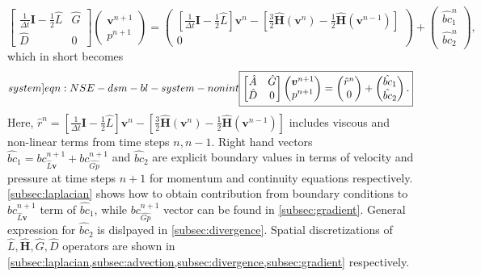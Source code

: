 \documentclass{article}
\numberwithin{equation}{section}
\begin{document}
	\begin{equation}
		\begin{bmatrix}
			\frac{1}{\Delta t}\mathbf{I}-\frac{1}{2}\hat{L} & \hat{G} \\
			\hat{D} & 0
		\end{bmatrix}
		\begin{pmatrix}
			\boldsymbol{v}^{n+1} \\ 
			p^{n+1}
		\end{pmatrix}
		=
		\begin{pmatrix}
			\left[\frac{1}{\Delta t}\mathbf{I}-\frac{1}{2}\hat{L}\right] \boldsymbol{v}^n - \left[\frac{3}{2}\hat{\mathbf{H}}(\boldsymbol{v}^n) - \frac{1}{2}\hat{\mathbf{H}}(\boldsymbol{v}^{n-1})\right]\\
			0
		\end{pmatrix}
		+
		\begin{pmatrix}
			\hat{bc}_1^n\\
			\hat{bc}_2^n
		\end{pmatrix},
	\end{equation}	
which in short becomes
\begin{equation}\label[system]{eqn:NSE-dsm-bl-system-nonint}
	\boxed{\begin{bmatrix}
		\hat{A} & \hat{G} \\
		\hat{D} & 0
	\end{bmatrix}
	\begin{pmatrix}
		\boldsymbol{v}^{n+1} \\ 
		p^{n+1}
	\end{pmatrix}
	=
	\begin{pmatrix}
		\hat{r}^n \\
		0
	\end{pmatrix}
	+
	\begin{pmatrix}
		\hat{bc}_1\\
		\hat{bc}_2
	\end{pmatrix}.}
\end{equation}
Here, $\hat{r}^n=\left[\frac{1}{\Delta t}\mathbf{I}-\frac{1}{2}\hat{L}\right] \boldsymbol{v}^n - \left[\frac{3}{2}\hat{\mathbf{H}}(\boldsymbol{v}^n) - \frac{1}{2}\hat{\mathbf{H}}(\boldsymbol{v}^{n-1})\right]$ includes viscous and non-linear terms from time steps $n,n-1$. Right hand vectors $\hat{bc}_1=bc^{n+1}_{\hat{L}\boldsymbol{v}}+bc^{n+1}_{\hat{Gp}}$ and $\hat{bc}_2$ are explicit boundary values in terms of velocity and pressure at time steps $n+1$ for momentum and continuity equations respectively. \cref{subsec:laplacian} shows how to obtain contribution from boundary conditions to $bc^{n+1}_{\hat{L}\boldsymbol{v}}$ term of $\hat{bc}_1$, while $bc^{n+1}_{\hat{Gp}}$ vector can be found in \cref{subsec:gradient}. General expression for $\hat{bc}_2$ is dislpayed in \cref{subsec:divergence}. Spatial discretizations of $\hat{L},\hat{\mathbf{H}},\hat{G},\hat{D}$ operators are shown in \cref{subsec:laplacian,subsec:advection,subsec:divergence,subsec:gradient} respectively. 
\end{document}
